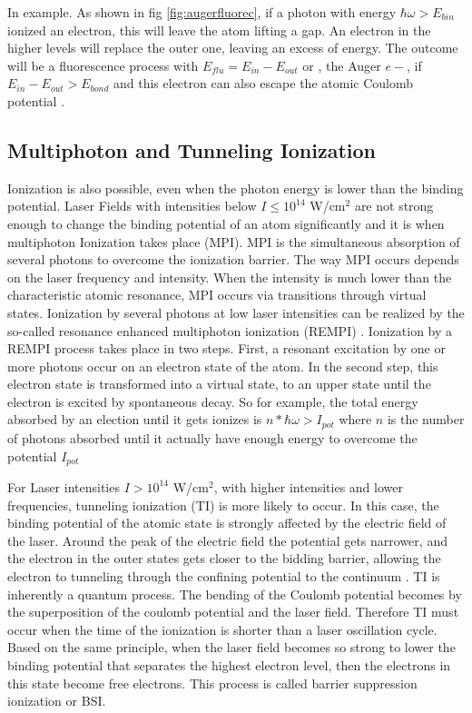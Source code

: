 In example. As shown in fig \ref{fig:augerfluorec}, if a photon  with energy $\hbar\omega > E_{bin}$  ionized an electron, this will leave the atom lifting a gap. An electron in the higher levels will replace the outer one, leaving an excess of energy. The outcome will be a fluorescence process with $E_{flu} = E_{in}- E_{out}$ or , the Auger $e-$, if $ E_{in}-E_{out} > E_{bond}$ and this electron can also escape the atomic Coulomb potential \cite{schmidt_electron_1997}.



\subsection{Multiphoton and Tunneling Ionization}

Ionization is also possible, even when the photon energy is lower than the binding potential. Laser Fields with intensities below $I \leqslant 10^{14}$ W/cm$^{2}$ are not strong enough to change the binding potential of an atom significantly \cite{rhodes_multiphoton_1985} and it is when multiphoton Ionization takes place (MPI).  MPI is the simultaneous absorption of several photons to overcome the ionization barrier. The way MPI occurs depends on the laser frequency and intensity. When the intensity is much lower than the characteristic atomic resonance, MPI occurs via transitions through virtual states. Ionization by several photons at low laser intensities can be realized by the so-called resonance enhanced multiphoton ionization (REMPI) \cite{mainfray_multiphoton_nodate}.  Ionization by a REMPI process takes place in two steps. First, a resonant excitation by one or more photons occur on an electron state of the atom. In the second step, this electron state is transformed into a virtual state, to an upper state until the electron is excited by spontaneous decay. So for example, the total energy absorbed by an election until it gets ionizes is $n * \hbar\omega > I_{pot}$ where $n$ is the number of photons absorbed until it actually have enough energy to overcome the potential $I_{pot}$

For Laser intensities $I > 10^{14}$ W/cm$^{2}$,  with higher intensities and lower frequencies, tunneling ionization (TI) is more likely to occur.  In this case, the binding potential of the atomic state is strongly affected by the electric field of the laser. Around the peak of the electric field the  potential gets narrower, and the electron in the outer states gets closer to the bidding barrier, allowing the electron to tunneling through the confining potential to the continuum  \cite{griffiths_introduction_2013}. TI is inherently a quantum process. The bending of the Coulomb potential becomes by the superposition of the coulomb potential and the laser field. Therefore TI must occur when the time of the ionization is shorter than a laser oscillation cycle\cite{berkowitz_photoabsorption_1979}. Based on the same principle, when the laser field becomes so strong to lower the binding potential that separates the highest electron level, then the electrons in this state become free electrons. This process is called barrier suppression ionization or BSI\cite{krishnan_doped_2011}.

